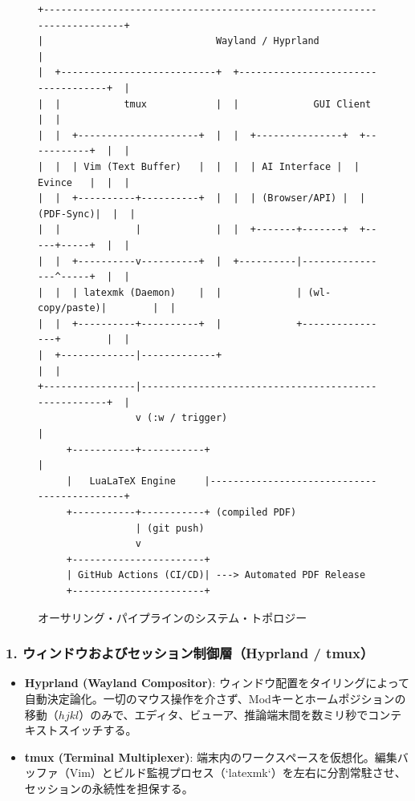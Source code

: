 \begin{figure}[htbp]
\centering
\begin{verbatim}
+-------------------------------------------------------------------------+
|                              Wayland / Hyprland                         |
|  +---------------------------+  +------------------------------------+  |
|  |           tmux            |  |             GUI Client             |  |
|  |  +---------------------+  |  |  +---------------+  +-----------+  |  |
|  |  | Vim (Text Buffer)   |  |  |  | AI Interface |  |  Evince   |  |  |
|  |  +----------+----------+  |  |  | (Browser/API) |  | (PDF-Sync)|  |  |
|  |             |             |  |  +-------+-------+  +-----+-----+  |  |
|  |  +----------v----------+  |  +----------|----------------^-----+  |  |
|  |  | latexmk (Daemon)    |  |             | (wl-copy/paste)|        |  |
|  |  +----------+----------+  |             +----------------+        |  |
|  +-------------|-------------+                                       |  |
+----------------|-----------------------------------------------------+  |
                 v (:w / trigger)                                         |
     +-----------+-----------+                                            |
     |   LuaLaTeX Engine     |--------------------------------------------+
     +-----------+-----------+ (compiled PDF)
                 | (git push)
                 v
     +-----------------------+
     | GitHub Actions (CI/CD)| ---> Automated PDF Release
     +-----------------------+
\end{verbatim}
\caption{オーサリング・パイプラインのシステム・トポロジー}
\label{fig:pipeline_topology}
\end{figure}

\subsubsection{1. ウィンドウおよびセッション制御層（Hyprland / tmux）}
\begin{itemize}
    \item \textbf{Hyprland (Wayland Compositor)}:
    ウィンドウ配置をタイリングによって自動決定論化。一切のマウス操作を介さず、Modキーとホームポジションの移動（$hjkl$）のみで、エディタ、ビューア、推論端末間を数ミリ秒でコンテキストスイッチする。
    \item \textbf{tmux (Terminal Multiplexer)}:
    端末内のワークスペースを仮想化。編集バッファ（Vim）とビルド監視プロセス（`latexmk`）を左右に分割常駐させ、セッションの永続性を担保する。
\end{itemize}

